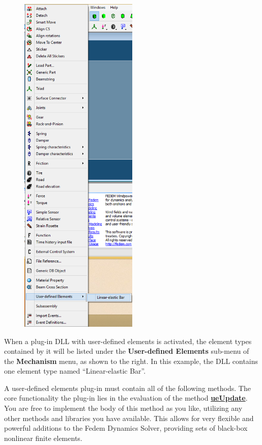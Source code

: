 \clearpage
\begin{figure}
  \includegraphics[trim=0 0 0 852,clip,width=0.5\textwidth]{Figures/2-MechanismMenu}
\end{figure}

When a plug-in DLL with user-defined elements is activated, the element
types contained by it will be listed under the
\textbf{User-defined Elements} sub-menu of the \textbf{Mechanism} menu,
as shown to the right. In this example, the DLL contains one element type
named ``Linear-elastic Bar''.

A user-defined elements plug-in must contain all of the following methods.
The core functionality the plug-in lies in the evaluation of the method
\protect\hyperlink{ueupdate}{\bf ueUpdate}.
You are free to implement the body of this method as you like, utilizing any
other methods and libraries you have available.
This allows for very flexible and powerful additions to the Fedem Dynamics
Solver, providing sets of black-box nonlinear finite elements.

